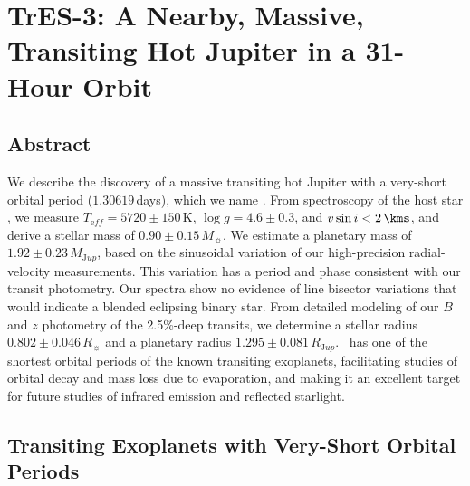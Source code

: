 \chapter[TrES-3: A Nearby, Massive, Transiting Hot Jupiter in a 31-Hour Orbit]%
{%
TrES-3: A Nearby, Massive, Transiting Hot Jupiter in a 31-Hour Orbit%
\protect\CFND%
}\label{cha:tres3}

\section*{Abstract}\label{cha:tres3:sec:abs}

We describe the discovery of a massive transiting hot Jupiter with a very-short orbital period (\mbox{$1.30619$}\,days), which we name \tresThree.
From spectroscopy of the host star \gscOTO, we measure \mbox{$T_{\mathrm eff} = 5720 \pm 150$\,K}, \mbox{$\log{g}=4.6 \pm 0.3$}, and \mbox{$v\sin{i} < 2\,\kms$}, and derive a stellar mass of $0.90\pm0.15\,M_{\sun}$.
We estimate a planetary mass of \mbox{$1.92 \pm 0.23\,M_{\mathrm Jup}$}, based on the sinusoidal variation of our high-precision radial-velocity measurements.
This variation has a period and phase consistent with our transit photometry.
Our spectra show no evidence of line bisector variations that would indicate a blended eclipsing binary star.
From detailed modeling of our $B$ and $z$ photometry of the 2.5\%-deep transits, we determine a stellar radius \mbox{$0.802\pm0.046\,R_{\sun}$} and a planetary radius \mbox{$1.295\pm0.081\,R_{\mathrm Jup}$}.
\tresThree\ has one of the shortest orbital periods of the known transiting exoplanets, facilitating studies of orbital decay and mass loss due to evaporation, and making it an excellent target for future studies of infrared emission and reflected starlight.

\section{Transiting Exoplanets with Very-Short Orbital Periods}\label{cha:tres3:sec:intro}

